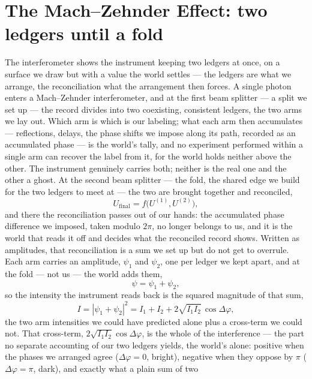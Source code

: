 \section{The Mach--Zehnder Effect: two ledgers until a fold}
\label{se:mach-zehnder}

The interferometer shows the instrument keeping two ledgers at once, on a surface we draw but with a value the
world settles --- the ledgers are what we arrange, the reconciliation what the arrangement then forces. A
single photon enters a Mach--Zehnder interferometer, and at the first beam splitter --- a split we set up ---
the record divides into two coexisting, consistent ledgers, the two arms we lay out. Which arm is which is our
labeling; what each arm then accumulates --- reflections, delays, the phase shifts we impose along its path,
recorded as an accumulated phase --- is the world's tally, and no experiment performed within a single arm can
recover the label from it, for the world holds neither above the other. The instrument genuinely carries both;
neither is the real one and the other a ghost. At the second beam splitter --- the fold, the shared edge we
build for the two ledgers to meet at --- the two are brought together and reconciled,
\begin{equation}
  U_{\mathrm{final}} = f\bigl(U^{(1)}, U^{(2)}\bigr),
\end{equation}
and there the reconciliation passes out of our hands: the accumulated phase difference we imposed, taken modulo
$2\pi$, no longer belongs to us, and it is the world that reads it off and decides what the reconciled record
shows. Written as amplitudes, that reconciliation is a sum we set up but do not get to overrule. Each arm
carries an amplitude, $\psi_1$ and $\psi_2$, one per ledger we kept apart, and at the fold --- not us --- the
world adds them,
\begin{equation}
  \psi = \psi_1 + \psi_2,
\end{equation}
so the intensity the instrument reads back is the squared magnitude of that sum,
\begin{equation}
  I = |\psi_1 + \psi_2|^2 = I_1 + I_2 + 2\sqrt{I_1 I_2}\,\cos\Delta\varphi,
\end{equation}
the two arm intensities we could have predicted alone plus a cross-term we could not. That cross-term,
$2\sqrt{I_1 I_2}\cos\Delta\varphi$, is the whole of the interference --- the part no separate accounting of our
two ledgers yields, the world's alone: positive when the phases we arranged agree ($\Delta\varphi = 0$,
bright), negative when they oppose by $\pi$ ($\Delta\varphi = \pi$, dark), and exactly what a plain sum of two
